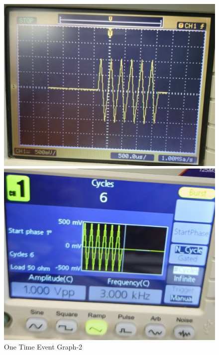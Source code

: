 \documentclass[12pt,a4paper]{report}
\begin{document}
    \begin{figure}[H] %
    \centering
    \begin{minipage}[c]{0.48\textwidth}
        \includegraphics[width=\textwidth]{figs/2cro one.jpg} %
        
    \end{minipage}
    \hfill
    \begin{minipage}[c]{0.48\textwidth}
        \includegraphics[width=\textwidth]{figs/2one.jpg} %
       
    \end{minipage}
     \caption{One Time Event Graph-2}
    \label{fig:ONE TIME EVENT}
    
\end{figure}
\end{document}
